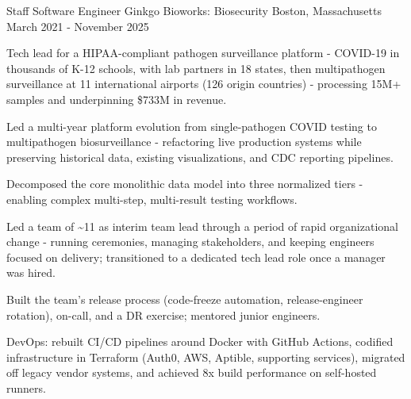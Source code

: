 
\begin{cventries}

  \cventry%
  {Staff Software Engineer} %
  {Ginkgo Bioworks: Biosecurity} %
  {Boston, Massachusetts} %
  {March 2021 \-- November 2025} %
  {%
    \begin{cvsentence}Tech lead for a HIPAA-compliant pathogen surveillance platform \-- COVID-19 in thousands of K-12 schools, with lab partners in 18 states, then multipathogen surveillance at 11 international airports (126 origin countries) \-- processing 15M+ samples and underpinning \$733M in revenue.
    \end{cvsentence}
    \begin{cvitems} %
    \item {Led a multi-year platform evolution from single-pathogen
        COVID testing to multipathogen biosurveillance \-- refactoring
        live production systems while preserving historical data,
      existing visualizations, and CDC reporting pipelines.}
    \item {Decomposed the core monolithic data model into three normalized tiers \-- enabling complex multi-step, multi-result testing workflows.}
    \item {Led a team of \textasciitilde 11 as interim team lead
        through a period of rapid organizational change \-- running
        ceremonies, managing stakeholders, and keeping engineers
        focused on delivery; transitioned to a dedicated tech lead role
      once a manager was hired.}
    \item {Built the team's release process (code-freeze automation, release-engineer rotation), on-call, and a DR exercise; mentored junior engineers.}
    \item {DevOps: rebuilt CI/CD pipelines around Docker with GitHub
        Actions, codified infrastructure in Terraform (Auth0, AWS, Aptible,
        supporting services), migrated off legacy vendor systems, and
      achieved 8x build performance on self-hosted runners.}

\end{cvitems}}
\end{cventries}
